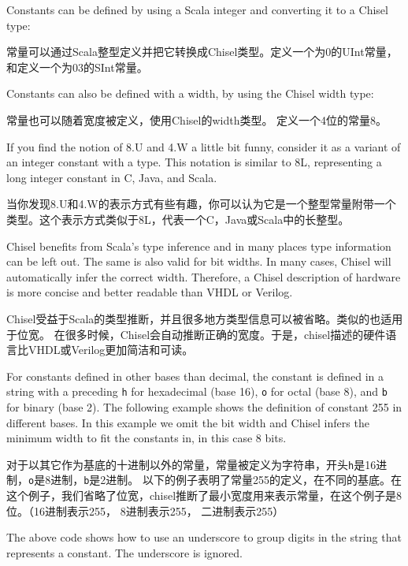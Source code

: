 \documentclass[%
    10pt,
    headinclude, footexclude,
    openright, %
    notitlepage,
    cleardoubleempty,
    headsepline,
    pointlessnumbers,
    bibtotoc, idxtotoc,
    ]{scrbook}
\newcommand{\code}[1]{{\small{\texttt{#1}}}}
\begin{document}

\noindent Constants can be defined by using a Scala integer and converting it to a Chisel type:

常量可以通过Scala整型定义并把它转换成Chisel类型。定义一个为0的UInt常量，和定义一个为03的SInt常量。


\noindent Constants can also be defined with a width, by using the Chisel width type:

常量也可以随着宽度被定义，使用Chisel的width类型。 定义一个4位的常量8。


\noindent If you find the notion of 8.U and 4.W a little bit funny, consider it as a variant of an integer
constant with a type. This notation is similar to 8L, representing a long integer constant in C, Java, and Scala.

当你发现8.U和4.W的表示方式有些有趣，你可以认为它是一个整型常量附带一个类型。这个表示方式类似于8L，代表一个C，Java或Scala中的长整型。

Chisel benefits from Scala's type inference and in many places type information can be left out.
The same is also valid for bit widths. In many cases, Chisel will automatically infer the correct width.
Therefore, a Chisel description of hardware is more concise and better readable than VHDL or
Verilog.

Chisel受益于Scala的类型推断，并且很多地方类型信息可以被省略。类似的也适用于位宽。
在很多时候，Chisel会自动推断正确的宽度。于是，chisel描述的硬件语言比VHDL或Verilog更加简洁和可读。

For constants defined in other bases than decimal, the constant is defined in a string with
a preceding \code{h} for hexadecimal (base 16), \code{o} for octal (base 8), and \code{b}
for binary (base 2). The following example shows the definition of constant 255 in different
bases. In this example we omit the bit width and Chisel infers the minimum width to fit
the constants in, in this case 8 bits.

对于以其它作为基底的十进制以外的常量，常量被定义为字符串，开头\code{h}是16进制，\code{o}是8进制，\code{b}是2进制。
以下的例子表明了常量255的定义，在不同的基底。在这个例子，我们省略了位宽，chisel推断了最小宽度用来表示常量，在这个例子是8位。（16进制表示255， 8进制表示255， 二进制表示255）



\noindent The above code shows how to use an underscore to group digits in the
string that represents a constant. The underscore is ignored.
\end{document}

